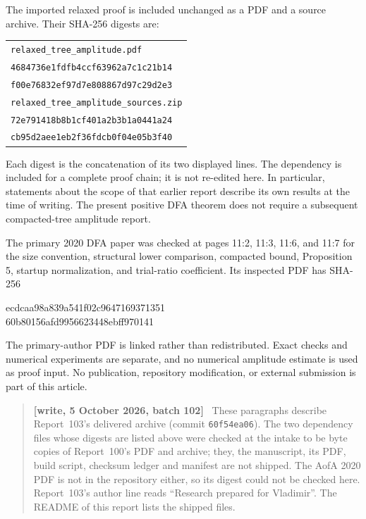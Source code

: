 \documentclass[11pt,letterpaper]{article}
\numberwithin{equation}{section}
\theoremstyle{remark}
\newenvironment{writenotejp}{\par\smallskip\begin{quote}\small\textbf{[write, 5 October 2026, batch 102]}\ }{\end{quote}\smallskip}
\begin{document}
The imported relaxed proof is included unchanged as a PDF and a source archive. Their SHA-256 digests are:
\begin{center}\small
\begin{tabular}{@{}l@{}}
\texttt{relaxed\_tree\_amplitude.pdf}\\
\texttt{4684736e1fdfb4ccf63962a7c1c21b14}\\
\texttt{f00e76832ef97d7e808867d97c29d2e3}\\[5pt]
\texttt{relaxed\_tree\_amplitude\_sources.zip}\\
\texttt{72e791418b8b1cf401a2b3b1a0441a24}\\
\texttt{cb95d2aee1eb2f36fdcb0f04e05b3f40}
\end{tabular}
\end{center}
Each digest is the concatenation of its two displayed lines. The dependency is included for a complete proof chain; it is not re-edited here. In particular, statements about the scope of that earlier report describe its own results at the time of writing. The present positive DFA theorem does not require a subsequent compacted-tree amplitude report.

The primary 2020 DFA paper was checked at pages 11:2, 11:3, 11:6, and 11:7 for the size convention, structural lower comparison, compacted bound, Proposition 5, startup normalization, and trial-ratio coefficient. Its inspected PDF has SHA-256
\begin{center}\small\ttfamily
ecdcaa98a839a541f02c9647169371351\\
60b80156afd9956623448ebff970141
\end{center}
The primary-author PDF is linked rather than redistributed. Exact checks and numerical experiments are separate, and no numerical amplitude estimate is used as proof input. No publication, repository modification, or external submission is part of this article.
\begin{writenotejp}
These paragraphs describe Report~103's delivered archive (commit \texttt{60f54ea06}). The two dependency files whose digests are listed above were checked at the intake to be byte copies of Report~100's PDF and archive; they, the manuscript, its PDF, build script, checksum ledger and manifest are not shipped. The AofA 2020 PDF is not in the repository either, so its digest could not be checked here. Report~103's author line reads ``Research prepared for Vladimir''. The README of this report lists the shipped files.
\end{writenotejp}
\end{document}
